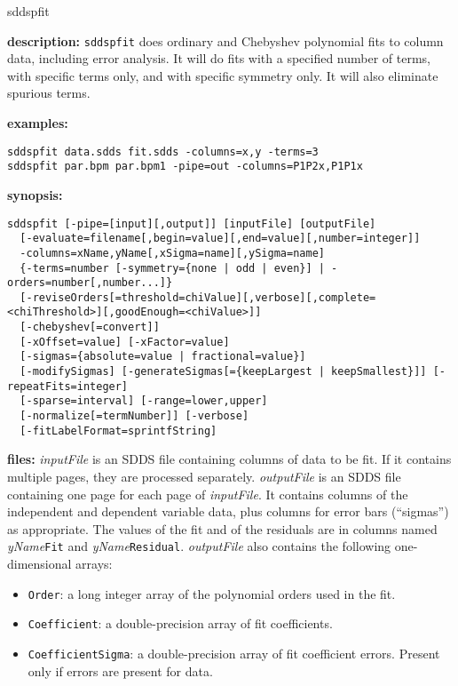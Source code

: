 \begin{sddsprog}{sddspfit}
  \item \textbf{description:} \verb|sddspfit| does ordinary and Chebyshev polynomial fits to column data, including error analysis. It will do fits with a specified number of terms, with specific terms only, and with specific symmetry only. It will also eliminate spurious terms.
  \item \textbf{examples:}
  \begin{verbatim}
sddspfit data.sdds fit.sdds -columns=x,y -terms=3
sddspfit par.bpm par.bpm1 -pipe=out -columns=P1P2x,P1P1x
  \end{verbatim}
  \item \textbf{synopsis:}
  \begin{verbatim}
sddspfit [-pipe=[input][,output]] [inputFile] [outputFile]
  [-evaluate=filename[,begin=value][,end=value][,number=integer]]
  -columns=xName,yName[,xSigma=name][,ySigma=name]
  {-terms=number [-symmetry={none | odd | even}] | -orders=number[,number...]}
  [-reviseOrders[=threshold=chiValue][,verbose][,complete=<chiThreshold>][,goodEnough=<chiValue>]]
  [-chebyshev[=convert]]
  [-xOffset=value] [-xFactor=value]
  [-sigmas={absolute=value | fractional=value}]
  [-modifySigmas] [-generateSigmas[={keepLargest | keepSmallest}]] [-repeatFits=integer]
  [-sparse=interval] [-range=lower,upper]
  [-normalize[=termNumber]] [-verbose]
  [-fitLabelFormat=sprintfString]
  \end{verbatim}
  \item \textbf{files:} \emph{inputFile} is an SDDS file containing columns of data to be fit. If it contains multiple pages, they are processed separately. \emph{outputFile} is an SDDS file containing one page for each page of \emph{inputFile}. It contains columns of the independent and dependent variable data, plus columns for error bars (``sigmas'') as appropriate. The values of the fit and of the residuals are in columns named \emph{yName}\verb|Fit| and \emph{yName}\verb|Residual|. \emph{outputFile} also contains the following one-dimensional arrays:
    \begin{itemize}
      \item \verb|Order|: a long integer array of the polynomial orders used in the fit.
      \item \verb|Coefficient|: a double-precision array of fit coefficients.
      \item \verb|CoefficientSigma|: a double-precision array of fit coefficient errors. Present only if errors are present for data.

\end{itemize}
\end{sddsprog}

